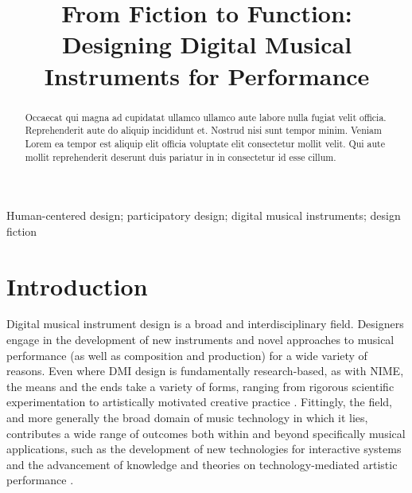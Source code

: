 \documentclass[]{interact}
\theoremstyle{plain}%
\theoremstyle{definition}
\theoremstyle{remark}
\begin{document}

\title{From Fiction to Function: Designing Digital Musical Instruments for Performance}

\author{
}

\maketitle

\begin{abstract}
Occaecat qui magna ad cupidatat ullamco ullamco aute labore nulla fugiat velit officia. Reprehenderit aute do aliquip incididunt et. Nostrud nisi sunt tempor minim. Veniam Lorem ea tempor est aliquip elit officia voluptate elit consectetur mollit velit. Qui aute mollit reprehenderit deserunt duis pariatur in in consectetur id esse cillum.
\end{abstract}

\begin{keywords}
Human-centered design; participatory design; digital musical instruments; design fiction
\end{keywords}

\section{Introduction}

Digital musical instrument design is a broad and interdisciplinary field. Designers engage in the development of new instruments and novel approaches to musical performance (as well as composition and production) for a wide variety of reasons. Even where DMI design is fundamentally research-based, as with NIME, the means and the ends take a variety of forms, ranging from rigorous scientific experimentation to artistically motivated creative practice \citep{Gurevich2016}. Fittingly, the field, and more generally the broad domain of music technology in which it lies, contributes a wide range of outcomes both within and beyond specifically musical applications, such as the development of new technologies for interactive systems \citep{malloch2018generalized} and the advancement of knowledge and theories on technology-mediated artistic performance \citep{Tahlroglu2020}. 
\end{document}
